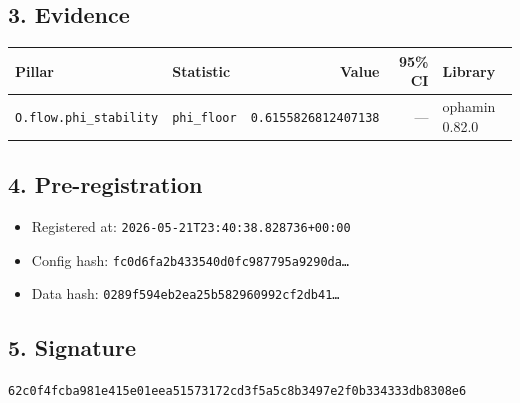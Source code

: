 \documentclass{article}
\begin{document}
\subsection*{3. Evidence}
\begin{tabular}{llrrl}\toprule
\textbf{Pillar} & \textbf{Statistic} & \textbf{Value} & \textbf{95\% CI} & \textbf{Library} \\\midrule
\texttt{O.flow.phi\_stability} & \texttt{phi\_floor} & \texttt{0.6155826812407138} & --- & ophamin 0.82.0 \\
\bottomrule\end{tabular}
\subsection*{4. Pre-registration}
\begin{itemize}
\item Registered at: \texttt{2026-05-21T23:40:38.828736+00:00}
\item Config hash: \texttt{fc0d6fa2b433540d0fc987795a9290da\dots}
\item Data hash: \texttt{0289f594eb2ea25b582960992cf2db41\dots}
\end{itemize}
\subsection*{5. Signature}
\texttt{62c0f4fcba981e415e01eea51573172cd3f5a5c8b3497e2f0b334333db8308e6}\\
\end{document}
